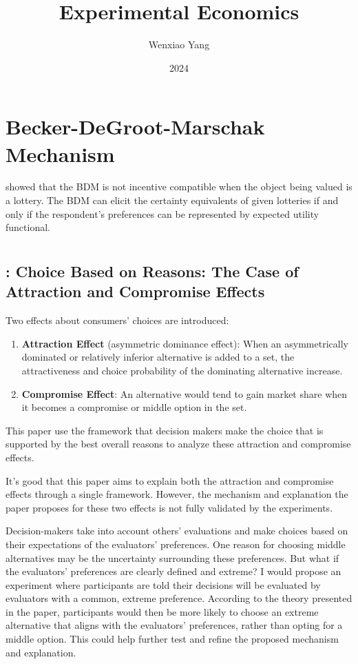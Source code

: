 \documentclass[11pt]{elegantbook}
\title{Experimental Economics}
\author{Wenxiao Yang}
\institute{Haas School of Business, University of California Berkeley}
\date{2024}
\begin{document}
\maketitle

\frontmatter
\tableofcontents

\mainmatter



\chapter{Becker-DeGroot-Marschak Mechanism}
\cite{karni1987preference} showed that the BDM is not incentive compatible when the object being valued is a lottery. The BDM can elicit the certainty equivalents of given lotteries if and only if the respondent's preferences can be represented by expected utility functional.


\chapter{}
\section{\cite{simonson1989choice}: Choice Based on Reasons: The Case of Attraction and Compromise Effects}
Two effects about consumers' choices are introduced:
\begin{enumerate}
    \item \textbf{Attraction Effect} (asymmetric dominance effect): When an asymmetrically dominated or relatively inferior alternative is added to a set, the attractiveness and choice probability of the dominating alternative increase.
    \item \textbf{Compromise Effect}: An alternative would tend to gain market share when it becomes a compromise or middle option in the set.
\end{enumerate}
This paper use the framework that decision makers make the choice that is supported by the best overall reasons to analyze these attraction and compromise effects.

It’s good that this paper aims to explain both the attraction and compromise effects through a single framework. However, the mechanism and explanation the paper proposes for these two effects is not fully validated by the experiments.

Decision-makers take into account others’ evaluations and make choices based on their expectations of the evaluators’ preferences. One reason for choosing middle alternatives may be the uncertainty surrounding these preferences. But what if the evaluators’ preferences are clearly defined and extreme? I would propose an experiment where participants are told their decisions will be evaluated by evaluators with a common, extreme preference. According to the theory presented in the paper, participants would then be more likely to choose an extreme alternative that aligns with the evaluators’ preferences, rather than opting for a middle option. This could help further test and refine the proposed mechanism and explanation.
\end{document}

